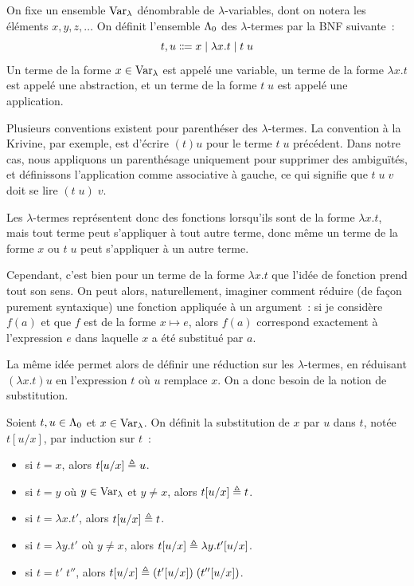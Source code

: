 \begin{definition}
  On fixe un ensemble $\lamVar$ dénombrable de $\lambda$-variables, dont on
  notera les éléments $x,y,z,\ldots$ On définit l'ensemble $\Lambda_0$ des
  $\lambda$-termes par la BNF suivante~:
  \[t,u\inddefeq x\mid \lambda x.t\mid t\;u\]
  Un terme de la forme $x \in \operatorname{Var}_{\lambda}$ est appelé une variable, un terme de la
  forme $\lambda x.t$ est appelé une abstraction, et un terme de la forme
  $t\;u$ est appelé une application.
  \index[notation]{$\lamVar$}
  \index[notation]{$\lamSet$}
\end{definition}

\begin{remark}
  Plusieurs conventions existent pour parenthéser des $\lambda$-termes. La
  convention à la Krivine, par exemple, est d'écrire $(t)u$ pour le terme
  $t\;u$ précédent. Dans notre cas, nous appliquons un parenthésage uniquement
  pour supprimer des ambiguïtés, et définissons l'application comme associative
  à gauche, ce qui signifie que $t\;u\;v$ doit se lire $(t\;u)\;v$.
\end{remark}

Les $\lambda$-termes représentent donc des fonctions lorsqu'ils sont de la
forme $\lambda x.t$, mais tout terme peut s'appliquer à tout autre terme, donc
même un terme de la forme $x$ ou $t\;u$ peut s'appliquer à un autre terme.

Cependant, c'est bien pour un terme de la forme $\lambda x.t$ que l'idée de
fonction prend tout son sens. On peut alors, naturellement, imaginer comment
réduire (de façon purement syntaxique) une fonction appliquée à un argument~:
si je considère $f(a)$ et que $f$ est de la forme $x \mapsto e$, alors
$f(a)$ correspond exactement à l'expression $e$ dans laquelle $x$ a été
substitué par $a$.

La même idée permet alors de définir une réduction sur les $\lambda$-termes,
en réduisant $(\lambda x.t)u$ en l'expression $t$ où $u$ remplace $x$. On a donc
besoin de la notion de substitution.

\begin{definition}
  Soient $t,u\in\Lambda_0$ et $x \in \operatorname{Var}_{\lambda}$. On définit la substitution de
  $x$ par $u$ dans $t$, notée $t[u/x]$, par induction sur $t$~:
  \begin{itemize}
  \item si $t = x$, alors $t[u/x] \triangleq u$.
  \item si $t = y$ où $y \in \operatorname{Var}_{\lambda}$ et $y \neq x$, alors $t[u/x] \triangleq t$.
  \item si $t = \lambda x.t'$, alors $t[u/x] \triangleq t$.
  \item si $t = \lambda y.t'$ où $y \neq x$, alors
    $t[u/x] \triangleq \lambda y.t'[u/x]$.
  \item si $t = t'\;t''$, alors $t[u/x] \triangleq (t'[u/x])\;(t''[u/x])$.
  \end{itemize}
\end{definition}

